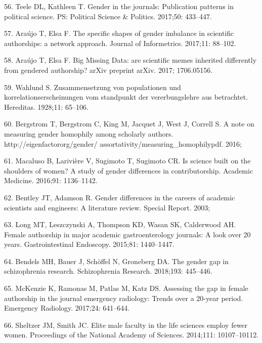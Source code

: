 \documentclass[12pt,]{article}
\begin{document}
\hypertarget{ref-Teele_2017}{}
56. Teele DL, Kathleen T. Gender in the journals: Publication patterns
in political science. PS: Political Science \& Politics. 2017;50:
433--447.

\hypertarget{ref-Araujo_2017a}{}
57. Araújo T, Elsa F. The specific shapes of gender imbalance in
scientific authorships: a network approach. Journal of Informetrics.
2017;11: 88--102.

\hypertarget{ref-Araujo_2017b}{}
58. Araújo T, Elsa F. Big Missing Data: are scientific memes inherited
differently from gendered authorship? arXiv preprint arXiv. 2017;
1706.05156.

\hypertarget{ref-Wahlund_1928}{}
59. Wahlund S. Zusammensetzung von populationen und
korrelationserscheinungen vom standpunkt der vererbungslehre aus
betrachtet. Hereditas. 1928;11: 65--106.

\hypertarget{ref-bergstrom_2016}{}
60. Bergstrom T, Bergstrom C, King M, Jacquet J, West J, Correll S. A
note on measuring gender homophily among scholarly authors.
http://eigenfactororg/gender/ assortativity/measuring\_homophilypdf.
2016;

\hypertarget{ref-macaluso_2016}{}
61. Macaluso B, Larivière V, Sugimoto T, Sugimoto CR. Is science built
on the shoulders of women? A study of gender differences in
contributorship. Academic Medicine. 2016;91: 1136--1142.

\hypertarget{ref-Bentley_2003}{}
62. Bentley JT, Adamson R. Gender differences in the careers of academic
scientists and engineers: A literature review. Special Report. 2003;

\hypertarget{ref-Long_2015}{}
63. Long MT, Leszczynski A, Thompson KD, Wasan SK, Calderwood AH. Female
authorship in major academic gastroenterology journals: A look over 20
years. Gastrointestinal Endoscopy. 2015;81: 1440--1447.

\hypertarget{ref-Bendels_2018}{}
64. Bendels MH, Bauer J, Schöffel N, Groneberg DA. The gender gap in
schizophrenia research. Schizophrenia Research. 2018;193: 445--446.

\hypertarget{ref-McKenzie_2017}{}
65. McKenzie K, Ramonas M, Patlas M, Katz DS. Assessing the gap in
female authorship in the journal emergency radiology: Trends over a
20-year period. Emergency Radiology. 2017;24: 641--644.

\hypertarget{ref-sheltzer_2014}{}
66. Sheltzer JM, Smith JC. Elite male faculty in the life sciences
employ fewer women. Proceedings of the National Academy of Sciences.
2014;111: 10107--10112.
\end{document}
